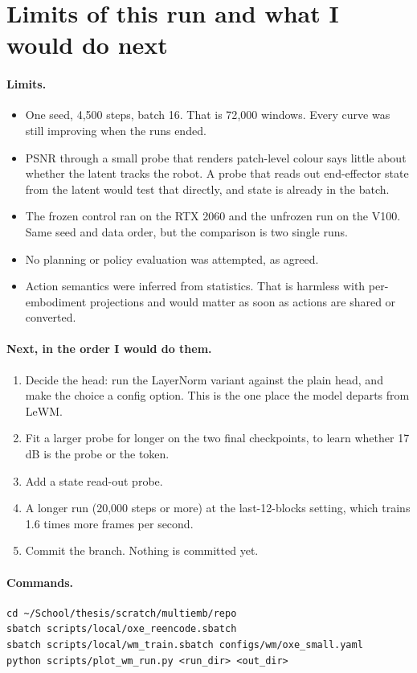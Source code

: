 \documentclass[10pt]{article}
\begin{document}
\section{Limits of this run and what I would do next}
\paragraph{Limits.}
\begin{itemize}
\item One seed, 4{,}500 steps, batch 16. That is 72{,}000 windows. Every curve was still improving when the runs ended.
\item PSNR through a small probe that renders patch-level colour says little about whether
  the latent tracks the robot. A probe that reads out end-effector state from the latent
  would test that directly, and state is already in the batch.
\item The frozen control ran on the RTX 2060 and the unfrozen run on the V100. Same seed
  and data order, but the comparison is two single runs.
\item No planning or policy evaluation was attempted, as agreed.
\item Action semantics were inferred from statistics. That is harmless with per-embodiment
  projections and would matter as soon as actions are shared or converted.
\end{itemize}

\paragraph{Next, in the order I would do them.}
\begin{enumerate}
\item Decide the head: run the LayerNorm variant against the plain head, and make the choice
  a config option. This is the one place the model departs from LeWM.
\item Fit a larger probe for longer on the two final checkpoints, to learn whether 17\,dB is
  the probe or the token.
\item Add a state read-out probe.
\item A longer run (20{,}000 steps or more) at the last-12-blocks setting, which trains 1.6
  times more frames per second.
\item Commit the branch. Nothing is committed yet.
\end{enumerate}

\paragraph{Commands.}
\begin{verbatim}
cd ~/School/thesis/scratch/multiemb/repo
sbatch scripts/local/oxe_reencode.sbatch
sbatch scripts/local/wm_train.sbatch configs/wm/oxe_small.yaml
python scripts/plot_wm_run.py <run_dir> <out_dir>
\end{verbatim}
\end{document}
